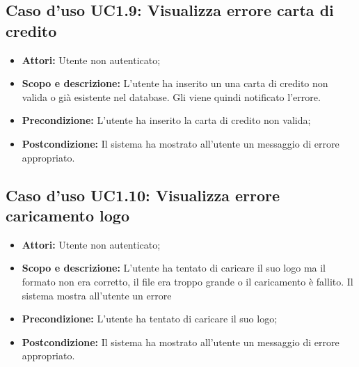 \documentclass[12pt,a4paper,titlepage]{article}
\begin{document}
	\subsection{Caso d'uso UC1.9: Visualizza errore carta di credito}
	\label{UC1.9}
	\begin{itemize}
		\item \textbf{Attori: }Utente non autenticato;
		\item \textbf{Scopo e descrizione: }L'utente ha inserito un una carta di credito non valida o già esistente nel database. Gli viene quindi notificato l'errore.
		\item \textbf{Precondizione: }L'utente ha inserito la carta di credito non valida;
		\item \textbf{Postcondizione: }Il sistema ha mostrato all'utente un messaggio di errore appropriato.
	\end{itemize}
	\subsection{Caso d'uso UC1.10: Visualizza errore caricamento logo}
	\label{UC1.10}
	\begin{itemize}
		\item \textbf{Attori: }Utente non autenticato;
		\item \textbf{Scopo e descrizione: }L'utente ha tentato di caricare il suo logo ma il formato non era corretto, il file era troppo grande o il caricamento è fallito. Il sistema mostra all'utente un errore
		\item \textbf{Precondizione: }L'utente ha tentato di caricare il suo logo;
		\item \textbf{Postcondizione: }Il sistema ha mostrato all'utente un messaggio di errore appropriato.
	\end{itemize}
\end{document}
